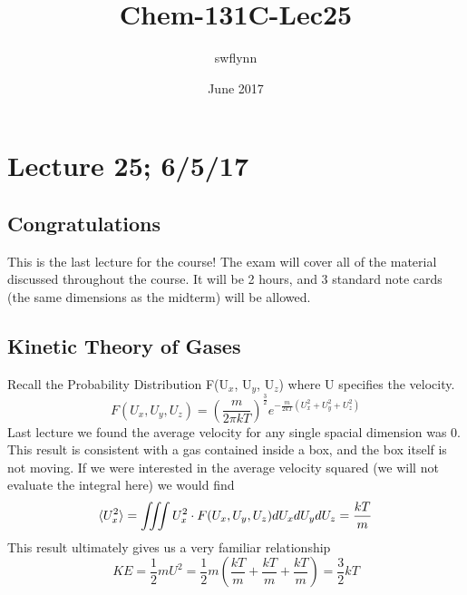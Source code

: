 \documentclass{article}
\title{Chem-131C-Lec25}
\author{swflynn}
\date{June 2017}
\begin{document}
\maketitle

\section*{Lecture 25; 6/5/17}
\subsection*{Congratulations}
This is the last lecture for the course!
The exam will cover all of the material discussed throughout the course. 
It will be 2 hours, and 3 standard note cards (the same dimensions as the midterm) will be allowed. 

\subsection*{Kinetic Theory of Gases} 
Recall the Probability Distribution F(U$_x$, U$_y$, U$_z$) where U specifies the velocity.
\begin{equation}
    F(U_x,U_y,U_z) = \left(\frac{m}{2\pi kT}\right)^{\frac{3}{2}}e^{-\frac{m}{2kT}(U_x^2+U_y^2+U_z^2)}
\end{equation}
Last lecture we found the average velocity for any single spacial dimension was 0.
This result is consistent with a gas contained inside a box, and the box itself is not moving. 
If we were interested in the average velocity squared (we will not evaluate the integral here) we would find
\begin{equation}
    \braket{U_x^2} = \iiint U_x^2 \cdot F(U_x,U_y,U_z)dU_xdU_ydU_z = \frac{kT}{m}
\end{equation}
This result ultimately gives us a very familiar relationship
\begin{equation}
    KE = \frac{1}{2}mU^2 = \frac{1}{2}m \left( \frac{kT}{m} +  \frac{kT}{m} +  \frac{kT}{m} \right) = \frac{3}{2}kT
\end{equation}
\end{document}
